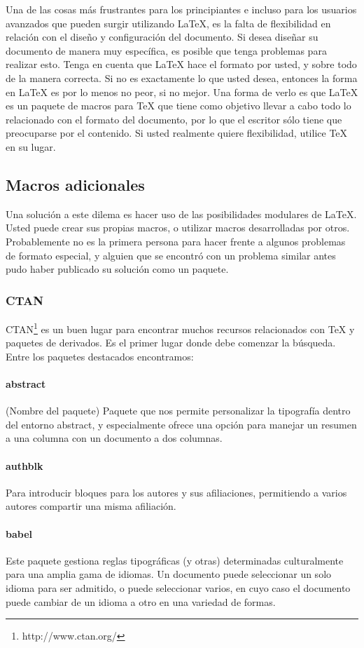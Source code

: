 \documentclass[letterpaper,11pt]{achemso} %
\begin{document}
	Una de las cosas más frustrantes para los principiantes e incluso para los usuarios avanzados que pueden surgir utilizando \LaTeX, es la falta de flexibilidad en relación con el diseño y configuración del documento. Si desea diseñar su documento de manera muy específica, es posible que tenga problemas para realizar esto. Tenga en cuenta que LaTeX hace el formato por usted, y sobre todo de la manera correcta. Si no es exactamente lo que usted desea, entonces la forma en LaTeX es por lo menos no peor, si no mejor. Una forma de verlo es que LaTeX es un paquete de macros para TeX que tiene como objetivo llevar a cabo todo lo relacionado con el formato del documento, por lo que el escritor sólo tiene que preocuparse por el contenido. Si usted realmente quiere flexibilidad, utilice TeX en su lugar.
	
	\subsection{Macros adicionales}
	
	Una solución a este dilema es hacer uso de las posibilidades modulares de LaTeX. Usted puede crear sus propias macros, o utilizar macros desarrolladas por otros. Probablemente no es la primera persona para hacer frente a algunos problemas de formato especial, y alguien que se encontró con un problema similar antes pudo haber publicado su solución como un paquete.
	
	\subsubsection{CTAN}
	
	CTAN\footnote{http://www.ctan.org/} es un buen lugar para encontrar muchos recursos relacionados con TeX y paquetes de derivados. Es el primer lugar donde debe comenzar la búsqueda. Entre los paquetes destacados encontramos:
	
	\paragraph{abstract} (Nombre del paquete) Paquete que nos permite personalizar la tipografía dentro del entorno abstract, y especialmente ofrece una opción para manejar un resumen a una columna con un documento a dos columnas.
	
	\paragraph{authblk} Para introducir bloques para los autores y sus afiliaciones, permitiendo a varios autores compartir una misma afiliación.
	
	\paragraph{babel} Este paquete gestiona reglas tipográficas (y otras) determinadas culturalmente para una amplia gama de idiomas. Un documento puede seleccionar un solo idioma para ser admitido, o puede seleccionar varios, en cuyo caso el documento puede cambiar de un idioma a otro en una variedad de formas.
\end{document}
